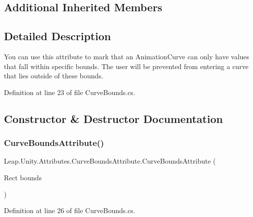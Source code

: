 \subsection*{Additional Inherited Members}


\subsection{Detailed Description}
You can use this attribute to mark that an Animation\+Curve can only have values that fall within specific bounds. The user will be prevented from entering a curve that lies outside of these bounds. 



Definition at line 23 of file Curve\+Bounds.\+cs.



\subsection{Constructor \& Destructor Documentation}
\mbox{\label{class_leap_1_1_unity_1_1_attributes_1_1_curve_bounds_attribute_a282d5c0e4993e943d40952569281fa85}} 
\subsubsection{\texorpdfstring{CurveBoundsAttribute()}{CurveBoundsAttribute()}\hspace{0.1cm}{\footnotesize\ttfamily [1/2]}}
{\footnotesize\ttfamily Leap.\+Unity.\+Attributes.\+Curve\+Bounds\+Attribute.\+Curve\+Bounds\+Attribute (\begin{DoxyParamCaption}\item[{Rect}]{bounds }\end{DoxyParamCaption})}



Definition at line 26 of file Curve\+Bounds.\+cs.

\mbox{\label{class_leap_1_1_unity_1_1_attributes_1_1_curve_bounds_attribute_a4d51496341784854816dae3025b43974}} 
